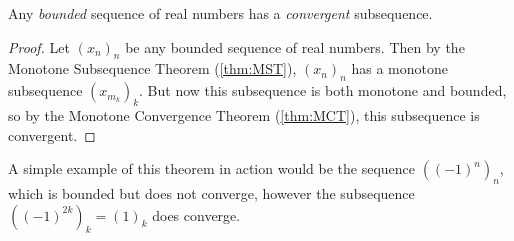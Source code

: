 \documentclass[../real_analysis.tex]{subfiles}
\begin{document}
            \begin{theorem}\label{thm:BWT}
                Any \textit{bounded} sequence of real numbers has a \textit{convergent} subsequence.
            \end{theorem}
            \begin{proof}
                Let $(x_n)_n$ be any bounded sequence of real numbers. Then by the Monotone Subsequence Theorem (\ref{thm:MST}), $(x_n)_n$ has a monotone subsequence $(x_{m_k})_k$. But now this subsequence is both monotone and bounded, so by the Monotone Convergence Theorem (\ref{thm:MCT}), this subsequence is convergent.
            \end{proof}
            A simple example of this theorem in action would be the sequence $((-1)^n)_n$, which is bounded but does not converge, however the subsequence $((-1)^{2k})_k=(1)_k$ does converge.
\end{document}
